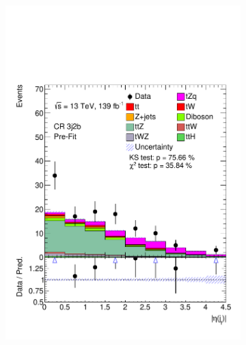 \begin{figure}
    \begin{subfigure}[b]{0.32\linewidth}
    \centering
    \includegraphics[width=\linewidth]{ubonn-thesis/Chapters/Chapters_06/Figure/Input_distribution/CR_3j2b_forwardjet_eta.pdf} 
  \end{subfigure}%
  \begin{subfigure}[b]{0.32\linewidth}
    \centering

\end{subfigure}
\end{figure}
